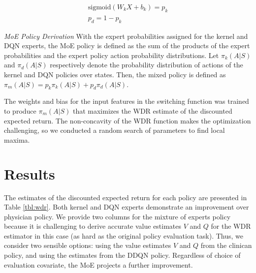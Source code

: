 \documentclass[10pt]{amia}
\begin{document}
\begin{align}
\label{eq:moe}
\text{sigmoid}(W_{k}X + b_{k}) = p_{k} \\
p_{d} = 1 - p_{k}
\end{align}

\textit{MoE Policy Derivation}
With the expert probabilities assigned for the kernel and DQN experts, the MoE policy is defined as the sum of the products of the expert probabilities and the expert policy action probability distributions. Let $\pi_{k}(A|S)$ and $\pi_{d}(A|S)$ 
respectively denote the probability distribution of actions of the kernel and DQN policies over states. Then, the mixed policy is defined as $\pi_{m}(A|S)=p_{k}\pi_{k}(A|S) + p_{d}\pi_{d}(A|S)$.



The weights and bias for the input features in the switching function was trained to produce $\pi_{m}(A|S)$ that maximizes the WDR\cite{thomas2016data} estimate of the discounted expected return. The non-concavity of the WDR function makes the optimization challenging, so we conducted a random search of parameters to find local maxima.


\section*{Results}

The estimates of the discounted expected return for each policy are presented in Table \ref{tbl:wdr}.  Both kernel and DQN experts demonstrate an improvement over physician policy. We provide two columns for the mixture of experts policy because it is challenging to derive accurate value estimates $V$ and $Q$ for the WDR estimator in this case (as hard as the original policy evaluation task).  Thus, we consider two sensible options: using the value estimates $V$ and $Q$ from the clinican policy, and using the estimates from the DDQN policy.  Regardless of choice of evaluation covariate, the MoE projects a further improvement. 


\end{document}
